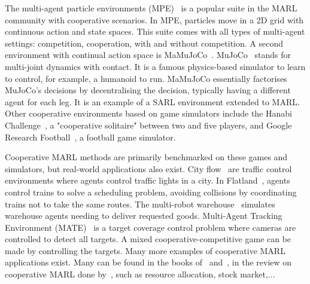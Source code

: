 
The multi-agent particle environments (MPE)~\citep{lowe2017multi} is a popular suite in the MARL community with cooperative scenarios.
In MPE, particles move in a 2D grid with continuous action and state spaces.
This suite comes with all types of multi-agent settings: competition, cooperation, with and without competition.
A second environment with continual action space is MaMuJoCo~\citep{peng2021facmac}.
MuJoCo~\citep{todorov2012mujoco} stands for multi-joint dynamics with contact.
It is a famous physics-based simulator to learn to control, for example, a humanoid to run.
MaMuJoCo essentially factorises MuJoCo's decisions by decentralising the decision, typically having a different agent for each leg.
It is an example of a SARL environment extended to MARL.
Other cooperative environments based on game simulators include the Hanabi Challenge~\citep{Bard_2020}, a "cooperative solitaire" between two and five players, and Google Research Football~\citep{kurach2020google}, a football game simulator.

Cooperative MARL methods are primarily benchmarked on these games and simulators, but real-world applications also exist.
City flow~\citep{zhang2019cityflow} are traffic control environments where agents control traffic lights in a city.
In Flatland~\citep{mohanty2020flatland}, agents control trains to solve a scheduling problem, avoiding collisions by coordinating trains not to take the same routes.
The multi-robot warehouse~\citep{papoudakis2021benchmarking, christianos2020shared} simulates warehouse agents needing to deliver requested goods.
Multi-Agent Tracking Environment (MATE)~\citep{NEURIPS2022_b2a1c152} is a target coverage control problem where cameras are controlled to detect all targets.
A mixed cooperative-competitive game can be made by controlling the targets.
Many more examples of cooperative MARL applications exist.
Many can be found in the books of~\cite{DecPomdp} and~\cite{marl-book}, in the review on cooperative MARL done by~\cite{oroojlooy2022review}, such as resource allocation, stock market,...


